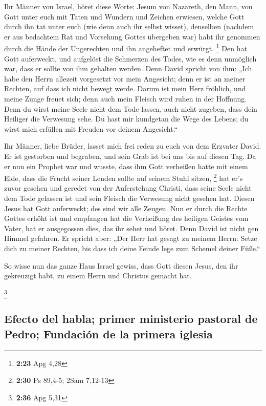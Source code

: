  Ihr Männer von Israel, höret diese Worte: Jesum von
Nazareth, den Mann, von Gott unter euch mit Taten und Wundern und
Zeichen erwiesen, welche Gott durch ihn tat unter euch (wie denn auch
ihr selbst wisset),  denselben (nachdem er aus bedachtem
Rat und Vorsehung Gottes übergeben war) habt ihr genommen durch die
Hände der Ungerechten und ihn angeheftet und erwürgt. \footnote{\textbf{2:23}
  Apg 4,28}  Den hat Gott auferweckt, und aufgelöst die
Schmerzen des Todes, wie es denn unmöglich war, dass er sollte von ihm
gehalten werden.  Denn David spricht von ihm: „Ich habe
den Herrn allezeit vorgesetzt vor mein Angesicht; denn er ist an meiner
Rechten, auf dass ich nicht bewegt werde.  Darum ist mein
Herz fröhlich, und meine Zunge freuet sich; denn auch mein Fleisch wird
ruhen in der Hoffnung.  Denn du wirst meine Seele nicht
dem Tode lassen, auch nicht zugeben, dass dein Heiliger die Verwesung
sehe.  Du hast mir kundgetan die Wege des Lebens; du
wirst mich erfüllen mit Freuden vor deinem Angesicht.``

 Ihr Männer, liebe Brüder, lasset mich frei reden zu euch
von dem Erzvater David. Er ist gestorben und begraben, und sein Grab ist
bei uns bis auf diesen Tag.  Da er nun ein Prophet war
und wusste, dass ihm Gott verheißen hatte mit einem Eide, dass die
Frucht seiner Lenden sollte auf seinem Stuhl sitzen, \footnote{\textbf{2:30}
  Ps 89,4-5; 2Sam 7,12-13}  hat er's zuvor gesehen und
geredet von der Auferstehung Christi, dass seine Seele nicht dem Tode
gelassen ist und sein Fleisch die Verwesung nicht gesehen hat.
 Diesen Jesus hat Gott auferweckt; des sind wir alle
Zeugen.  Nun er durch die Rechte Gottes erhöht ist und
empfangen hat die Verheißung des heiligen Geistes vom Vater, hat er
ausgegossen dies, das ihr sehet und höret.  Denn David
ist nicht gen Himmel gefahren. Er spricht aber: „Der Herr hat gesagt zu
meinem Herrn: Setze dich zu meiner Rechten,  bis dass ich
deine Feinde lege zum Schemel deiner Füße.``

 So wisse nun das ganze Haus Israel gewiss, dass Gott
diesen Jesus, den ihr gekreuzigt habt, zu einem Herrn und Christus
gemacht hat.

\footnote{\textbf{2:36} Apg 5,31}

\hypertarget{efecto-del-habla-primer-ministerio-pastoral-de-pedro-fundaciuxf3n-de-la-primera-iglesia}{%
\subsection{Efecto del habla; primer ministerio pastoral de Pedro;
Fundación de la primera
iglesia}\label{efecto-del-habla-primer-ministerio-pastoral-de-pedro-fundaciuxf3n-de-la-primera-iglesia}}

